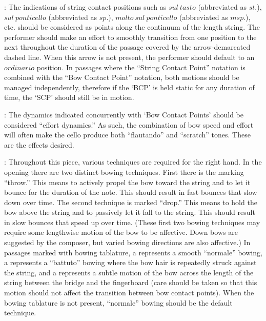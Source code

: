 \documentclass[10pt]{article}
\newcommand*\circled[1]{\tikz[baseline=(char.base)]{
            \node[shape=circle,draw,inner sep=1pt] (char) {#1};}}
\begin{document}
\begingroup
\begin{center}
: The indications of string contact positions such as $sul \ tasto$ (abbreviated as $st.$), $sul \ ponticello$ (abbreviated as $sp.$), $molto \ sul \ ponticello$ (abbreviated as $msp.$), etc. should be considered as points along the continuum of the length string. The performer should make an effort to smoothly transition from one position to the next throughout the duration of the passage covered by the arrow-demarcated dashed line. When this arrow is not present, the performer should default to an $ordinario$ position. In passages where the ``String Contact Point'' notation is combined with the ``Bow Contact Point'' notation, both motions should be managed independently, therefore if the `BCP' is held static for any duration of time, the `SCP' should still be in motion.
\rightskip\leftskip
\phantom{text} \hfill \phantom{()}
\end{center}
\endgroup

\begingroup
\begin{center}
: The dynamics indicated concurrently with `Bow Contact Points' should be considered ``effort dynamics.'' As such, the combination of bow speed and effort will often make the cello produce both ``flautando'' and ``scratch'' tones. These are the effects desired.
\rightskip\leftskip
\phantom{text} \hfill \phantom{()}
\end{center}
\endgroup

\begingroup
\begin{center}
: Throughout this piece, various techniques are required for the right hand. In the opening there are two distinct bowing techniques. \circled{1} First there is the marking ``throw.'' This means to actively propel the bow toward the string and to let it bounce for the duration of the note. This should result in fast bounces that slow down over time. \circled{2} The second technique is marked ``drop.'' This means to hold the bow above the string and to passively let it fall to the string. This should result in slow bounces that speed up over time. (These first two bowing techniques may require some lengthwise motion of the bow to be affective. Down bows are suggested by the composer, but varied bowing directions are also affective.) \circled{3} In passages marked with bowing tablature, a  represents a smooth ``normale'' bowing, a  represents a ``battuto'' bowing where the bow hair is repeatedly struck against the string, and a  represents a subtle motion of the bow across the length of the string between the bridge and the fingerboard (care should be taken so that this motion should not affect the transition between bow contact points). When the bowing tablature is not present, ``normale'' bowing should be the default technique.
\rightskip\leftskip
\phantom{text} \hfill \phantom{()}
\end{center}
\endgroup
\end{document}
